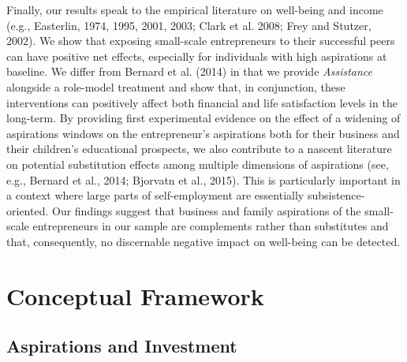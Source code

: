 \documentclass[11.5pt]{article}
\begin{document}
Finally, our results speak to the empirical literature on well-being and income (e.g., Easterlin, 1974, 1995, 2001, 2003; Clark et al. 2008; Frey and Stutzer, 2002). We show that exposing small-scale entrepreneurs to their successful peers can have positive net effects, especially for individuals with high aspirations at baseline. We differ from Bernard et al. (2014) in that we provide \emph{Assistance} alongside a role-model treatment and show that, in conjunction, these interventions can positively affect both financial and life satisfaction levels in the long-term. By providing first experimental evidence on the effect of a widening of aspirations windows on the entrepreneur's aspirations both for their business and their children's educational prospects, we also contribute to a nascent literature on potential substitution effects among multiple dimensions of aspirations (see, e.g., Bernard et al., 2014; Bjorvatn et al., 2015). This is particularly important in a context where large parts of self-employment are essentially subsistence-oriented. Our findings suggest that business and family aspirations of the small-scale entrepreneurs in our sample are complements rather than substitutes and that, consequently, no discernable negative impact on well-being can be detected.

\section{Conceptual Framework} \label{sec:theory}

\subsection{Aspirations and Investment}
\end{document}
